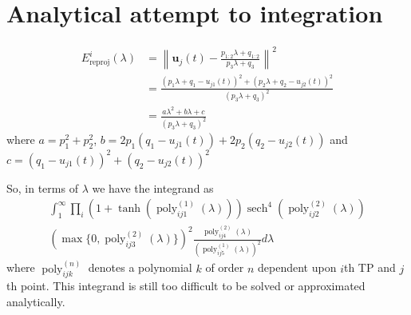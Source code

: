 \documentclass[10pt,twocolumn,letterpaper]{article}
\newcommand{\pos}[2]{\mathbf{p}^{(#1)}(#2)}
\newcommand{\trackpj}[1]{\mathbf{u}_j(#1)}
\newcommand{\dimsn}[1]{\mathbf{B}^{#1}}
\newcommand{\EnergyCol}{\mathcal{E}^{ijt}_{\text{col}}}
\DeclareMathOperator{\sech}{sech}
\DeclareMathOperator{\poly}{poly}
\begin{document}

\section{Analytical attempt to integration}
  \begin{align}
    E^i_{\text{reproj}}(\lambda) &= \left\|\trackpj{t} - \frac{p_{1:2}\lambda +
  q_{1:2}}{p_3\lambda + q_3}\right\|^2\\
  &= \frac{(p_1\lambda + q_1 - u_{j1}(t))^2 + (p_2\lambda + q_2 - u_{j2}(t))^2}
  {(p_3\lambda + q_3)^2}\\
  &= \frac{a\lambda^2 + b\lambda + c}{(p_3\lambda + q_3)^2}
  \end{align}
  where $a = p_1^2 + p_2^2$, $b = 2p_1(q_1 - u_{j1}(t)) + 2p_2(q_2 - u_{j2}(t))$
  and $c = (q_1 - u_{j1}(t))^2 + (q_2 - u_{j2}(t))^2$

  So, in terms of $\lambda$ we have the integrand as
  \begin{multline}
    \int_1^\infty
    \prod_i (1 +
    \tanh(\poly^{(1)}_{ij1}(\lambda)))\sech^4(\poly^{(2)}_{ij2}(\lambda))\\
    (\max\{ 0, \poly^{(2)}_{ij3}(\lambda) \})^2
    \frac{\poly^{(2)}_{ij4}(\lambda)}{(\poly^{(1)}_{ij5}(\lambda))^2}d\lambda
  \end{multline}
  where $\poly^{(n)}_{ijk}$ denotes a polynomial $k$ of order $n$ dependent upon $i$th
  TP and $j$th point. This integrand is still too difficult to
  be solved or approximated analytically.
\end{document}
